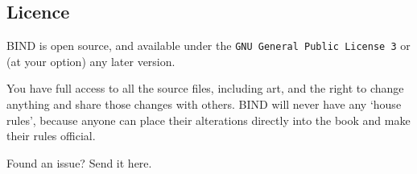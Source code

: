 \begin{multicols}{2}
\subsection*{Licence}

BIND is open source, and available under the {\tt GNU General Public License 3} or (at your option) any later version.

You have full access to all the source files, including art, and the right to change anything and share those changes with others.
BIND will never have any `house rules', because anyone can place their alterations directly into the book and make their rules official.

\begin{center}
  
  Found an issue?
  Send it here.
\end{center}

\end{multicols}

\pagebreak
